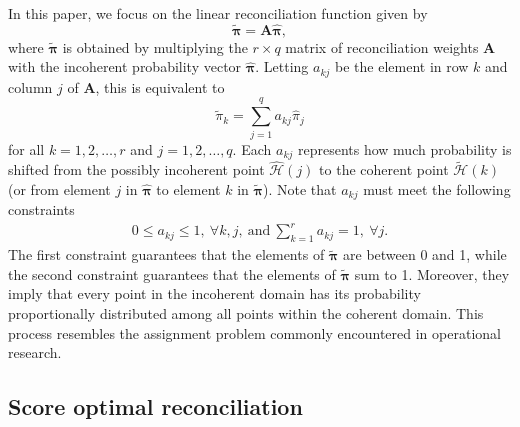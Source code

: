 \documentclass[a4paper,review,12pt,authoryear]{elsarticle}
\newcommand{\bpi}{\bm{\pi}}
\theoremstyle{definition}
\begin{document}
    In this paper, we focus on the linear reconciliation function given by
    \begin{equation}
      \label{eq:framework}
    \tilde{\bpi}=\bm{A}\hat{\bpi},
    \end{equation}
    where $\tilde{\bpi}$ is obtained by multiplying the $r \times q$ matrix of reconciliation weights $\bm{A}$ with the incoherent probability vector $\hat{\bpi}$. Letting $a_{kj}$ be the element in row $k$ and column $j$ of $\bm{A}$, this is equivalent to
    \[
      \tilde{\pi}_k=\sum\limits_{j=1}^q a_{kj}\hat{{\pi}}_j
    \]
    for all $k = 1, 2, \dots, r$  and  $j = 1, 2, \dots, q$.
    Each $a_{kj}$ represents how much probability is shifted from the possibly incoherent point $\hat{\mathcal{H}}(j)$ to the coherent point $\tilde{\mathcal{H}}(k)$ (or from element $j$ in $\hat{\bpi}$ to element $k$ in $\tilde{\bpi}$). Note that $a_{kj}$ must meet the following constraints
    \begin{align*}
    0\leq a_{kj} \leq 1 , ~ \forall k, j, ~ \textrm{and} ~
    \sum\limits_{k=1}^r a_{kj} = 1 , ~ \forall j.
    \end{align*}
    The first constraint guarantees that the elements of $\tilde{\bpi}$ are between 0 and 1, while the second constraint guarantees that the elements of $\tilde{\bpi}$ sum to 1.
    Moreover, they imply that every point in the incoherent domain has its probability proportionally distributed among all points  within the coherent domain.
    This process resembles the assignment problem commonly encountered in operational research.

    \subsection{Score optimal reconciliation}
    \label{sec:algorithm}
\end{document}
